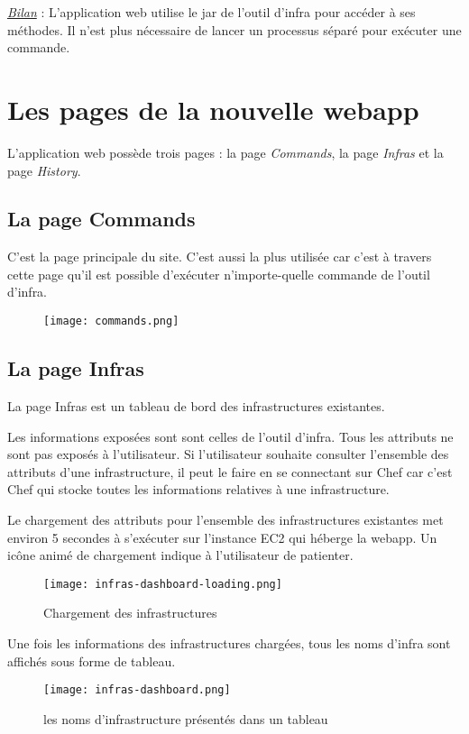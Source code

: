 \underline{\textit{Bilan}} : L'application web utilise le jar de l'outil d'infra
pour accéder à ses méthodes. Il n'est plus nécessaire de lancer un processus
séparé pour exécuter une commande.

\section{Les pages de la nouvelle webapp}
L'application web possède trois pages :
la page \textit{Commands}, la page \textit{Infras} et la page \textit{History}.

\subsection{La page Commands}

C'est la page principale du site. C'est aussi la plus utilisée car c'est à
travers cette page qu'il est possible d'exécuter n'importe-quelle commande de
l'outil d'infra. 

\begin{figure}[H]
  \texttt{[image: commands.png]}  
\end{figure}

\clearpage
\vspace*{1cm}

\subsection{La page Infras}

La page Infras est un tableau de bord des infrastructures existantes.

Les informations exposées sont sont celles de l'outil d'infra. Tous les
attributs ne sont pas exposés à l'utilisateur. Si l'utilisateur souhaite
consulter l'ensemble des attributs d'une infrastructure, il peut le faire en se
connectant sur Chef car c'est Chef qui stocke toutes les informations relatives
à une infrastructure.

Le chargement des attributs pour l'ensemble des infrastructures existantes met
environ 5 secondes à s'exécuter sur l'instance EC2 qui héberge la webapp.
Un icône animé de chargement indique à l'utilisateur de patienter.

\begin{figure}[H]
  \texttt{[image: infras-dashboard-loading.png]}  
  \caption{Chargement des infrastructures}
\end{figure}

\clearpage
Une fois les informations des infrastructures chargées, tous les noms d'infra
sont affichés sous forme de tableau.
\begin{figure}[H]
  \texttt{[image: infras-dashboard.png]}  
  \caption{les noms d'infrastructure présentés dans un tableau}
\end{figure}

